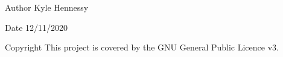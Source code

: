 \begin{DoxyAuthor}{Author}
Kyle Hennessy 
\end{DoxyAuthor}
\begin{DoxyDate}{Date}
12/11/2020 
\end{DoxyDate}
\begin{DoxyCopyright}{Copyright}
This project is covered by the G\+NU General Public Licence v3. 
\end{DoxyCopyright}

